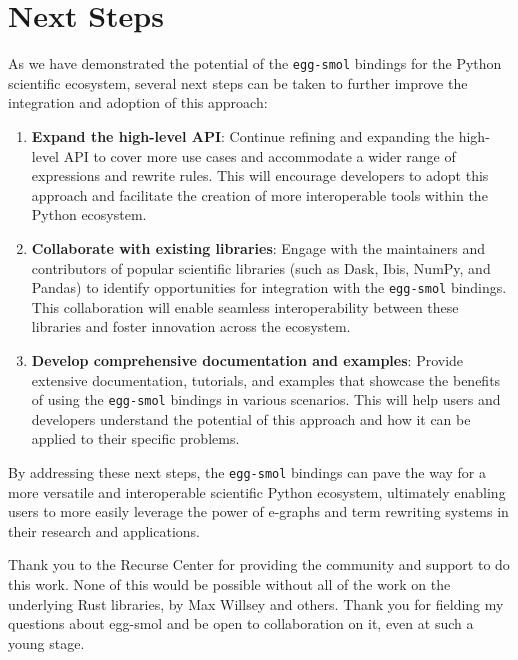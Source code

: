 \documentclass[sigplan,screen,review]{acmart}
\begin{document}
\section{Next Steps}

As we have demonstrated the potential of the \verb|egg-smol| bindings for the Python scientific ecosystem, several next steps can be taken to further improve the integration and adoption of this approach:

\begin{enumerate}
\item \textbf{Expand the high-level API}: Continue refining and expanding the high-level API to cover more use cases and accommodate a wider range of expressions and rewrite rules. This will encourage developers to adopt this approach and facilitate the creation of more interoperable tools within the Python ecosystem.

\item \textbf{Collaborate with existing libraries}: Engage with the maintainers and contributors of popular scientific libraries (such as Dask, Ibis, NumPy, and Pandas) to identify opportunities for integration with the \verb|egg-smol| bindings. This collaboration will enable seamless interoperability between these libraries and foster innovation across the ecosystem.

\item \textbf{Develop comprehensive documentation and examples}: Provide extensive documentation, tutorials, and examples that showcase the benefits of using the \verb|egg-smol| bindings in various scenarios. This will help users and developers understand the potential of this approach and how it can be applied to their specific problems.
\end{enumerate}

By addressing these next steps, the \verb|egg-smol| bindings can pave the way for a more versatile and interoperable scientific Python ecosystem, ultimately enabling users to more easily leverage the power of e-graphs and term rewriting systems in their research and applications.



\begin{acks}
Thank you to the Recurse Center for providing the community and support to do this work. None of this would be possible without all of the work on the underlying Rust libraries, by Max Willsey and others. Thank you for fielding my questions about egg-smol and be open to collaboration on it, even at such a young stage.

\end{acks}




\end{document}
